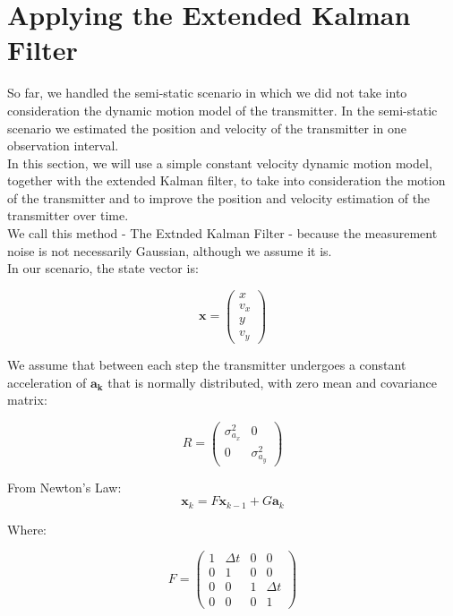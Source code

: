 \documentclass[10pt,a4paper]{report}
\begin{document}
\section{Applying the Extended Kalman Filter}
\label{applying_kalman}
So far, we handled the semi-static scenario in which we did not take into consideration
the dynamic motion model of the transmitter. In the semi-static scenario we estimated
the position and velocity of the transmitter in one observation interval.\\
In this section, we will use a simple constant velocity dynamic motion model, together
with the extended Kalman filter, to take into consideration the motion of the transmitter
and to improve the position and velocity estimation of the transmitter over time.\\
We call this method - The Extnded Kalman Filter - because the measurement noise is not
necessarily Gaussian, although we assume it is.\\
In our scenario, the state vector is:

\begin{equation}
\mathbf{x} = \begin{pmatrix}x \\ v_x \\ y \\ v_y\end{pmatrix}
\end{equation}

We assume that between each step the transmitter undergoes a constant acceleration of $\mathbf{a_k}$ that is normally distributed, with zero mean and covariance matrix:

\begin{equation}
R = \begin{pmatrix} \sigma^2_{a_x} & 0 \\ 0 & \sigma^2_{a_y} \end{pmatrix}
\end{equation}

From Newton's Law:
\begin{equation}
\mathbf{x}_k = F \mathbf{x}_{k-1}+G\mathbf{a}_k
\end{equation}

Where:

\begin{equation}
F = 
\begin{pmatrix}
1 & \Delta t & 0 & 0\\
0 & 1 & 0 & 0\\
0& 0& 1 & \Delta t\\
0& 0& 0& 1
\end{pmatrix}
\end{equation}
\end{document}
